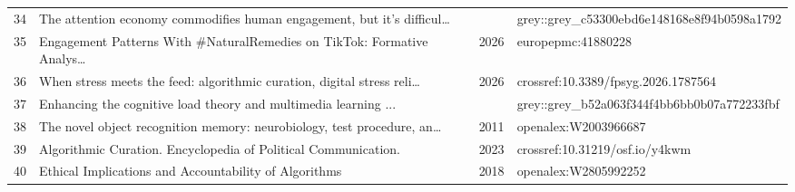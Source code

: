 \documentclass[11pt,a4paper]{article}
\begin{document}
\begin{longtable}{r p{} c p{}}
34 & The attention economy commodifies human engagement, but it’s difficul… &  & grey::grey\_c53300ebd6e148168e8f94b0598a1792 \\
35 & Engagement Patterns With \#NaturalRemedies on TikTok: Formative Analys… & 2026 & europepmc:41880228 \\
36 & When stress meets the feed: algorithmic curation, digital stress reli… & 2026 & crossref:10.3389/fpsyg.2026.1787564 \\
37 & Enhancing the cognitive load theory and multimedia learning ... &  & grey::grey\_b52a063f344f4bb6bb0b07a772233fbf \\
38 & The novel object recognition memory: neurobiology, test procedure, an… & 2011 & openalex:W2003966687 \\
39 & Algorithmic Curation. Encyclopedia of Political Communication. & 2023 & crossref:10.31219/osf.io/y4kwm \\
40 & Ethical Implications and Accountability of Algorithms & 2018 & openalex:W2805992252 \\
\bottomrule
\end{longtable}
\printbibliography[title={Quellenverzeichnis}]
\end{document}
